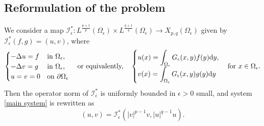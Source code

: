 \documentclass[reqno]{amsart}
\theoremstyle{remark}
\newcommand{\pa}{\partial}
\newcommand{\ep}{\epsilon}
\newcommand{\mci}{\mathcal{I}}
\newcommand{\dy}{\textup{d}y}
\renewcommand{\(}{\left(}
\renewcommand{\)}{\right)}
\numberwithin{equation}{section}
\begin{document}
\subsection{Reformulation of the problem}
We consider a map $\mci^*_\ep:L^{\frac{p+1}{p}}(\Omega_\ep)\times L^{\frac{q+1}{q}}(\Omega_\ep) \to X_{p,q}(\Omega_\ep)$ given by $\mci^*_\ep(f,g)=(u,v)$, where
$$
\begin{cases}
-\Delta u=f &\textup{in } \Omega_\ep,\\
-\Delta v=g &\textup{in } \Omega_\ep,\\
u=v=0 &\textup{on } \pa \Omega_\ep
\end{cases}
\quad \textup{or equivalently,} \quad
\begin{cases}
\displaystyle u(x)=\int_{\Omega_\ep} G_\ep(x,y)f(y)\dy,\\
\displaystyle v(x)=\int_{\Omega_\ep} G_\ep(x,y)g(y)\dy
\end{cases}
\textup{for } x \in \Omega_\ep.$$
Then the operator norm of $\mci^*_\ep$ is uniformly bounded in $\ep > 0$ small, and system \eqref{main system} is rewritten as
$$
(u,v)=\mci^*_\ep\(|v|^{p-1}v,|u|^{q-1}u\).
$$
\end{document}
